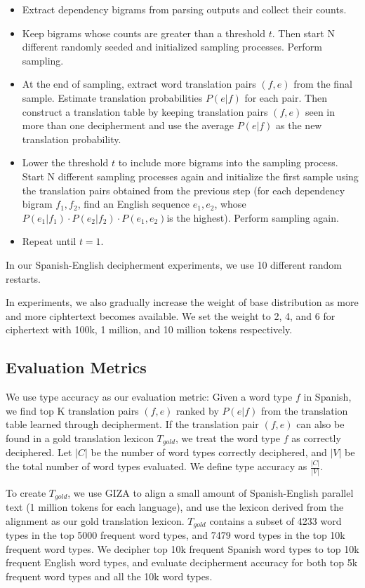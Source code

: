  \begin{itemize}
  \item Extract dependency bigrams from parsing outputs and collect their counts.
  \item Keep bigrams whose counts are greater than a threshold $t$. Then start N different randomly seeded and initialized sampling processes. Perform sampling.
  \item At the end of sampling, extract word translation pairs $(f,e)$ from the final sample. Estimate translation probabilities $P(e|f)$  for each pair. Then construct a translation table by keeping translation pairs $(f,e)$ seen in more than one decipherment and use the average $P(e|f)$ as the new translation probability.
  \item Lower the threshold $t$ to include more bigrams into the sampling process. Start N different sampling processes again and initialize the first sample using the translation pairs obtained from the previous step (for each dependency bigram $f_{1},f_{2}$, find an English sequence $e_{1},e_{2}$, whose $P(e_{1}|f_{1})\cdot P(e_{2}|f_{2})\cdot P(e_{1},e_{2})$is the highest). Perform sampling again.
  \item Repeat until $t=1$.
\end{itemize}

In our Spanish-English decipherment experiments, we use 10 different random restarts. 

In experiments, we also gradually increase the weight of base distribution as more and more ciphtertext becomes available. We set the weight to 2, 4, and 6 for ciphertext with 100k, 1 million, and 10 million tokens respectively. 

\subsection{Evaluation Metrics}
We use type accuracy as our evaluation metric: Given a word type $f$ in Spanish, we find top K translation pairs $(f,e)$ ranked by $P(e|f)$ from the translation table learned through decipherment. If the translation pair $(f,e)$ can also be found in a gold translation lexicon $T_{gold}$, we treat the word type $f$ as correctly deciphered. Let $|C|$ be the number of word types correctly deciphered, and $|V|$ be the total number of word types evaluated. We define type accuracy as $\frac{|C|}{|V|}$.

To create $T_{gold}$, we use GIZA to align a small amount of Spanish-English parallel text (1 million tokens for each language), and use the lexicon derived from the alignment as our gold translation lexicon. $T_{gold}$ contains a subset of 4233 word types in the top 5000 frequent word types, and 7479 word types in the top 10k frequent word types. We decipher top 10k frequent Spanish word types to top 10k frequent English word types, and evaluate decipherment accuracy for both top 5k frequent word types and all the 10k word types.

